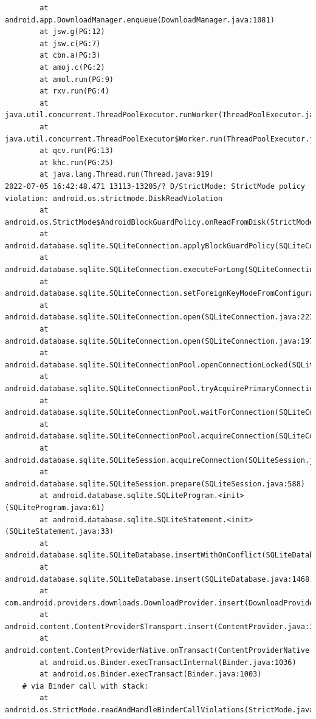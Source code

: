 \documentclass[a4paper,12pt]{book}
\begin{document}
\begin{lstlisting}
        at android.app.DownloadManager.enqueue(DownloadManager.java:1081)
        at jsw.g(PG:12)
        at jsw.c(PG:7)
        at cbn.a(PG:3)
        at amoj.c(PG:2)
        at amol.run(PG:9)
        at rxv.run(PG:4)
        at java.util.concurrent.ThreadPoolExecutor.runWorker(ThreadPoolExecutor.java:1167)
        at java.util.concurrent.ThreadPoolExecutor$Worker.run(ThreadPoolExecutor.java:641)
        at qcv.run(PG:13)
        at khc.run(PG:25)
        at java.lang.Thread.run(Thread.java:919)
2022-07-05 16:42:48.471 13113-13205/? D/StrictMode: StrictMode policy violation: android.os.strictmode.DiskReadViolation
        at android.os.StrictMode$AndroidBlockGuardPolicy.onReadFromDisk(StrictMode.java:1571)
        at android.database.sqlite.SQLiteConnection.applyBlockGuardPolicy(SQLiteConnection.java:1138)
        at android.database.sqlite.SQLiteConnection.executeForLong(SQLiteConnection.java:688)
        at android.database.sqlite.SQLiteConnection.setForeignKeyModeFromConfiguration(SQLiteConnection.java:290)
        at android.database.sqlite.SQLiteConnection.open(SQLiteConnection.java:223)
        at android.database.sqlite.SQLiteConnection.open(SQLiteConnection.java:197)
        at android.database.sqlite.SQLiteConnectionPool.openConnectionLocked(SQLiteConnectionPool.java:505)
        at android.database.sqlite.SQLiteConnectionPool.tryAcquirePrimaryConnectionLocked(SQLiteConnectionPool.java:949)
        at android.database.sqlite.SQLiteConnectionPool.waitForConnection(SQLiteConnectionPool.java:699)
        at android.database.sqlite.SQLiteConnectionPool.acquireConnection(SQLiteConnectionPool.java:380)
        at android.database.sqlite.SQLiteSession.acquireConnection(SQLiteSession.java:896)
        at android.database.sqlite.SQLiteSession.prepare(SQLiteSession.java:588)
        at android.database.sqlite.SQLiteProgram.<init>(SQLiteProgram.java:61)
        at android.database.sqlite.SQLiteStatement.<init>(SQLiteStatement.java:33)
        at android.database.sqlite.SQLiteDatabase.insertWithOnConflict(SQLiteDatabase.java:1597)
        at android.database.sqlite.SQLiteDatabase.insert(SQLiteDatabase.java:1468)
        at com.android.providers.downloads.DownloadProvider.insert(DownloadProvider.java:972)
        at android.content.ContentProvider$Transport.insert(ContentProvider.java:309)
        at android.content.ContentProviderNative.onTransact(ContentProviderNative.java:154)
        at android.os.Binder.execTransactInternal(Binder.java:1036)
        at android.os.Binder.execTransact(Binder.java:1003)
    # via Binder call with stack:
        at android.os.StrictMode.readAndHandleBinderCallViolations(StrictMode.java:2289)

\end{lstlisting}
\end{document}
